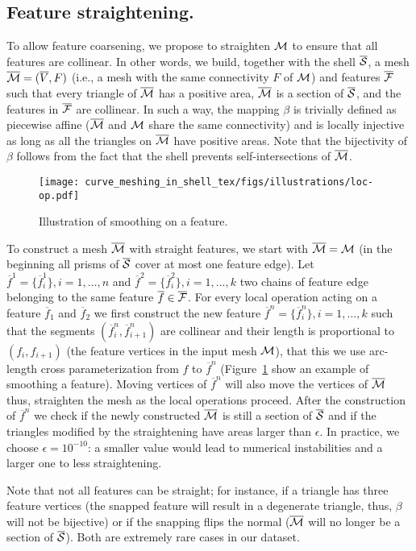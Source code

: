
\subsection{Feature straightening.}\label{cumin:sec:snapping}
To allow feature coarsening, we propose to straighten $\mathcal{M}$ to ensure that all features are collinear. In other words, we build, together with the shell $\overline{\mathcal{S}}$, a mesh $\overline{\mathcal{M}} = (\overline V,F)$ (i.e., a mesh with the same connectivity $F$ of $\mathcal{M}$) and features $\overline {\operatorname{\mathcal{F}}}$ such that every triangle of $\overline {\mathcal{M}}$ has a positive area, $\overline {\mathcal{M}}$ is a section of $\overline{\mathcal{S}}$, and the features in $\overline{\operatorname{\mathcal{F}}}$ are collinear. 
In such a way, the mapping $\beta$ is trivially defined as piecewise affine ($\overline{\mathcal{M}}$ and $\mathcal{M}$ share the same connectivity) and is locally injective as long as all the triangles on $\overline{\mathcal{M}}$ have positive {areas}. Note that the bijectivity of $\beta$ follows from the fact that the shell prevents self-intersections of $\overline{\mathcal{M}}$.


\begin{figure}
    \centering
    \texttt{[image: curve\_meshing\_in\_shell\_tex/figs/illustrations/loc-op.pdf]}
    \caption{Illustration of smoothing on a feature.}
    \label{bichon:fig:loc-op}
\end{figure}

To construct a mesh $\overline{\mathcal{M}}$ with straight features, 
we start with $\overline{\mathcal{M}} = \mathcal{M}$ (in the beginning all prisms of $\overline{\mathcal{S}}$ cover at most one feature edge).
Let $\overline f^1 = \{\overline f_i^1\}, i=1,\dots,n$ and $\overline f^2 = \{\overline f_i^2\}, i=1,\dots,k$ two chains of {feature} edge belonging to the same feature $\overline f \in \overline{\operatorname{\mathcal{F}}}$.
For every local operation acting on a feature $\overline f_1$ and $\overline f_2$  we first construct the new feature $\overline f^n = \{\overline f_i^n\}, i=1,\dots,k$ such that the segments $(\overline f_i^n, \overline f_{i+1}^n)$ are collinear and their length is proportional to $( f_i, f_{i+1})$ (the feature vertices in the input mesh $\mathcal{M}$), that this we use arc-length cross parameterization from $f$ to $\overline f^n$ (Figure~\ref{bichon:fig:loc-op} show an example of smoothing a feature). Moving vertices of $\overline f^n$ will also move the vertices of $\overline{\mathcal{M}}$ thus, straighten the mesh as the local operations {proceed}. After the construction of $\overline f^n$ we check if the newly constructed $\overline{\mathcal{M}}$ is still a section of $\overline{\mathcal{S}}$ and if the triangles modified by the straightening have {areas} larger than  $\epsilon$. In practice, we choose $\epsilon=10^{-10}$: a smaller value would lead to numerical instabilities and a larger one to less straightening.

Note that not all features can be {straight}; for instance, if a triangle has three feature vertices (the snapped feature will result {in} a degenerate triangle, thus, $\beta$ will not be bijective) or if the snapping flips the normal ($\overline{\mathcal{M}}$ will no longer be a section of $\overline{\mathcal{S}}$). Both are extremely rare cases in our dataset.

